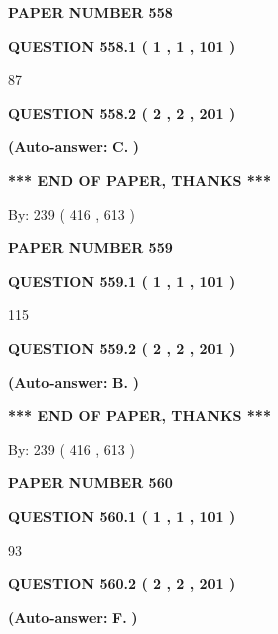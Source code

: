 \documentclass{ctexart}
\begin{document}
   
 {\textbf{ \Large{ PAPER NUMBER  558  }}}
   
   
   
   
  
  
{\textbf{\large{QUESTION
558.1 
 ( 1 , 1 , 101 )
}}}

87
  
  
{\textbf{\large{QUESTION
558.2 
 ( 2 , 2 , 201 )
}}}
 
 
{\textbf{(Auto-answer:}}
{\textbf{\large{
C.}}}
{\textbf{)}}
 
 
   
   
   
   
\vspace{1.0in} 
{\textbf{\large{ *** END OF PAPER, THANKS *** }}} 
   
   
\hspace{1.0in} By: 
 239 ( 416 ,  613 )
   
   
   
   
\newpage 
\setcounter{page}{ 
   559001 } 
   
   
 {\textbf{ \Large{ PAPER NUMBER  559  }}}
   
   
   
   
  
  
{\textbf{\large{QUESTION
559.1 
 ( 1 , 1 , 101 )
}}}

115
  
  
{\textbf{\large{QUESTION
559.2 
 ( 2 , 2 , 201 )
}}}
 
 
{\textbf{(Auto-answer:}}
{\textbf{\large{
B.}}}
{\textbf{)}}
 
 
   
   
   
   
\vspace{1.0in} 
{\textbf{\large{ *** END OF PAPER, THANKS *** }}} 
   
   
\hspace{1.0in} By: 
 239 ( 416 ,  613 )
   
   
   
   
\newpage 
\setcounter{page}{ 
   560001 } 
   
   
 {\textbf{ \Large{ PAPER NUMBER  560  }}}
   
   
   
   
  
  
{\textbf{\large{QUESTION
560.1 
 ( 1 , 1 , 101 )
}}}

93
  
  
{\textbf{\large{QUESTION
560.2 
 ( 2 , 2 , 201 )
}}}
 
 
{\textbf{(Auto-answer:}}
{\textbf{\large{
F.}}}
{\textbf{)}}
 
\end{document}
